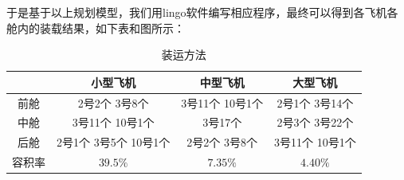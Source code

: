 \documentclass{article}
\begin{document}
	于是基于以上规划模型，我们用lingo软件编写相应程序，最终可以得到各飞机各舱内的装载结果，如下表和图所示：
	\newpage
	\begin{table}[!h]
		\centering
		\caption{装运方法}
		\begin{tabular}{|c|c|c|c|}
			\hline
			& 小型飞机             & 中型飞机         & 大型飞机         \\ \hline
			前舱 & 2号2个 3号8个       & 3号11个 10号1个 & 2号1个 3号14个  \\ \hline
			中舱 & 3号11个 10号1个     & 3号17个       & 2号3个 3号22个  \\ \hline
			后舱 & 2号1个 3号5个 10号1个 & 2号2个 3号8个   & 3号11个 10号1个 \\ \hline
			容积率 & $39.5\%$ & $7.35\%$ & $4.40\%$  \\ \hline
		\end{tabular}
	\end{table}

	\begin{figure}[!h]
		\centering 
	\end{figure}
\end{document}
